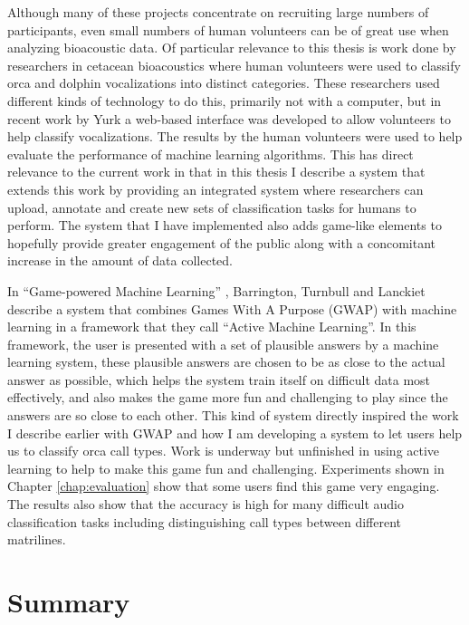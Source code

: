 \documentclass[12pt,oneside]{book}
\begin{document}
Although many of these projects concentrate on recruiting large
numbers of participants, even small numbers of human volunteers can be
of great use when analyzing bioacoustic data.  Of particular relevance
to this thesis is work done by researchers in cetacean bioacoustics
\cite{ford1991vocal} \cite{yurk2010sequential} \cite{yurkphd}
\cite{king2012imitation} where human volunteers were used to classify
orca and dolphin vocalizations into distinct categories.  These
researchers used different kinds of technology to do this, primarily
not with a computer, but in recent work by Yurk \cite{yurk2010sequential}
\cite{yurkphd} a web-based interface was developed to allow volunteers
to help classify vocalizations.  The results by the human volunteers
were used to help evaluate the performance of machine learning
algorithms.  This has direct relevance to the current work in that in
this thesis I describe a system that extends this work by providing
an integrated system where researchers can upload, annotate and create
new sets of classification tasks for humans to perform.  The system
that I have implemented also adds game-like elements to hopefully
provide greater engagement of the public along with a concomitant
increase in the amount of data collected.

In ``Game-powered Machine Learning'' \cite{barrington2012game},
Barrington, Turnbull and Lanckiet describe a system that combines
Games With A Purpose (GWAP) with machine learning in a framework that
they call ``Active Machine Learning''.  In this framework, the user is
presented with a set of plausible answers by a machine learning
system, these plausible answers are chosen to be as close to the
actual answer as possible, which helps the system train itself on
difficult data most effectively, and also makes the game more fun and
challenging to play since the answers are so close to each other.
This kind of system directly inspired the work I describe earlier
with GWAP and how I am developing a system to let users help us to
classify orca call types.  Work is underway but unfinished in using active
learning to help to make this game fun and challenging.  Experiments
shown in Chapter \ref{chap:evaluation} show that some users find this
game very engaging.  The results also show that the accuracy is high
for many difficult audio classification tasks including distinguishing
call types between different matrilines.

\section{Summary}
\label{section:relatedWork:summary}
\end{document}
